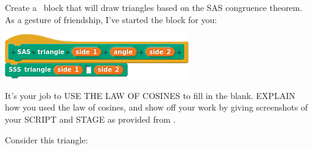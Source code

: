 \documentclass[noauthor,nooutcomes,12pt,handout]{ximera}
\begin{document}
\begin{question}
  Create a \snap\ block that will draw triangles based on the SAS
  congruence theorem.  As a gesture of friendship, I've started the
  block for you:
  \begin{center}
    \includegraphics{sasBlockBLANK}
  \end{center}
  It's your job to USE THE LAW OF COSINES to fill in the
  blank. EXPLAIN how you used the law of cosines, and show off your
  work by giving screenshots of your SCRIPT and STAGE as provided
  from \snap.
  \begin{freeResponse}
    Consider this triangle:
    \begin{center}
\end{center}
\end{freeResponse}
\end{question}
\end{document}
